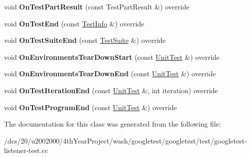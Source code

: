 \begin{DoxyCompactItemize}
void {\bfseries On\+Test\+Part\+Result} (const Test\+Part\+Result \&) override
\item 
\mbox{\label{classtesting_1_1internal_1_1EventRecordingListener2_a8651cee935f60407bd65d0162a6d9629}} 
void {\bfseries On\+Test\+End} (const \mbox{\hyperlink{classtesting_1_1TestInfo}{Test\+Info}} \&) override
\item 
\mbox{\label{classtesting_1_1internal_1_1EventRecordingListener2_aefd67a80de94cdd8e2e43c0fad812bd2}} 
void {\bfseries On\+Test\+Suite\+End} (const \mbox{\hyperlink{classtesting_1_1TestSuite}{Test\+Suite}} \&) override
\item 
\mbox{\label{classtesting_1_1internal_1_1EventRecordingListener2_a9b29ac6408f671e6b0fcafba75238573}} 
void {\bfseries On\+Environments\+Tear\+Down\+Start} (const \mbox{\hyperlink{classtesting_1_1UnitTest}{Unit\+Test}} \&) override
\item 
\mbox{\label{classtesting_1_1internal_1_1EventRecordingListener2_ac0c920b1264e59dfa7e8c9d159a77e8b}} 
void {\bfseries On\+Environments\+Tear\+Down\+End} (const \mbox{\hyperlink{classtesting_1_1UnitTest}{Unit\+Test}} \&) override
\item 
\mbox{\label{classtesting_1_1internal_1_1EventRecordingListener2_ae93c576efaf6f6d3afc455d05aa9eda8}} 
void {\bfseries On\+Test\+Iteration\+End} (const \mbox{\hyperlink{classtesting_1_1UnitTest}{Unit\+Test}} \&, int iteration) override
\item 
\mbox{\label{classtesting_1_1internal_1_1EventRecordingListener2_a95aeef757bba790c159b5a422030a86b}} 
void {\bfseries On\+Test\+Program\+End} (const \mbox{\hyperlink{classtesting_1_1UnitTest}{Unit\+Test}} \&) override
\end{DoxyCompactItemize}


The documentation for this class was generated from the following file\+:\begin{DoxyCompactItemize}
\item 
/dcs/20/u2002000/4th\+Year\+Project/wash/googletest/googletest/test/googletest-\/listener-\/test.\+cc\end{DoxyCompactItemize}
